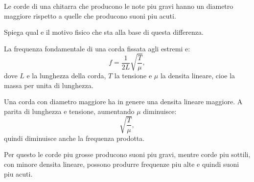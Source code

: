 
\begin{esercizio}
Le corde di una chitarra che producono le note piu gravi hanno un diametro
maggiore rispetto a quelle che producono suoni piu acuti.

Spiega qual e il motivo fisico che sta alla base di questa differenza.
\end{esercizio}

\begin{soluzione}
La frequenza fondamentale di una corda fissata agli estremi e:
\[
f=\frac{1}{2L}\sqrt{\frac{T}{\mu}},
\]
dove \(L\) e la lunghezza della corda, \(T\) la tensione e \(\mu\) la densita
lineare, cioe la massa per unita di lunghezza.

Una corda con diametro maggiore ha in genere una densita lineare maggiore.
A parita di lunghezza e tensione, aumentando \(\mu\) diminuisce:
\[
\sqrt{\frac{T}{\mu}},
\]
quindi diminuisce anche la frequenza prodotta.

Per questo le corde piu grosse producono suoni piu gravi, mentre corde piu
sottili, con minore densita lineare, possono produrre frequenze piu alte e
quindi suoni piu acuti.
\end{soluzione}
